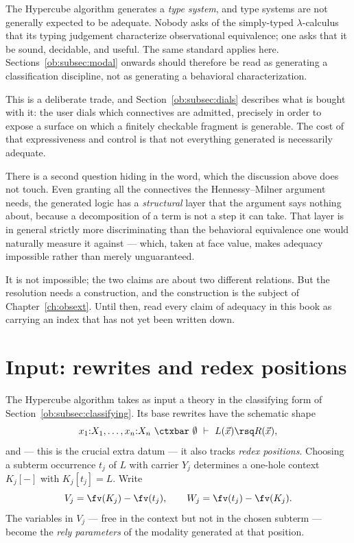 \begin{remark}
\label{ob:rem:no-adequacy}
The Hypercube algorithm generates a \emph{type system}, and type systems are not
generally expected to be adequate. Nobody asks of the simply-typed $\lambda$-calculus
that its typing judgement characterize observational equivalence; one asks that it be
sound, decidable, and useful. The same standard applies here. Sections~\ref{ob:subsec:modal}
onwards should therefore be read as generating a classification discipline, not as
generating a behavioral characterization.
\end{remark}

This is a deliberate trade, and Section~\ref{ob:subsec:dials} describes what is bought with
it: the user dials which connectives are admitted, precisely in order to expose a surface
on which a finitely checkable fragment is generable. The cost of that expressiveness and
control is that not everything generated is necessarily adequate.

\begin{remark}
\label{ob:rem:adequate-for-what}
There is a second question hiding in the word, which the discussion above does not
touch. Even granting all the connectives the Hennessy--Milner argument needs, the
generated logic has a \emph{structural} layer that the argument says nothing about,
because a decomposition of a term is not a step it can take. That layer is in
general strictly more discriminating than the behavioral equivalence one would
naturally measure it against --- which, taken at face value, makes adequacy
impossible rather than merely unguaranteed.

It is not impossible; the two claims are about two different relations. But the
resolution needs a construction, and the construction is the subject of
Chapter~\ref{ch:obsext}. Until then, read every claim of adequacy in this book as
carrying an index that has not yet been written down.
\end{remark}

\section{Input: rewrites and redex positions}

The Hypercube algorithm takes as input a theory in the classifying form of
Section~\ref{ob:subsec:classifying}. Its base rewrites have the schematic shape
\[
  x_1{:}X_1, \dots, x_n{:}X_n \ \ctxbar\ \emptyset \ \vdash\ L(\vec x) \rsq R(\vec x) ,
\]
and --- this is the crucial extra datum --- it also tracks \emph{redex positions}.
Choosing a subterm occurrence $t_j$ of $L$ with carrier $Y_j$ determines a one-hole
context $K_j[-]$ with $K_j[t_j] = L$. Write
\[
  V_j = \fv(K_j) - \fv(t_j), \qquad W_j = \fv(t_j) - \fv(K_j) .
\]
The variables in $V_j$ --- free in the context but not in the chosen subterm --- become
the \emph{rely parameters} of the modality generated at that position.

